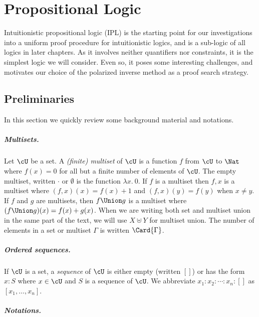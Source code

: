 \chapter{Propositional Logic}
\label{chapter-prop}

Intuitionistic propositional logic (IPL) is the starting point for our
investigations into a uniform proof procedure for intuitionistic logics, and is
a sub-logic of all logics in later chapters.  As it involves neither quantifiers
nor constraints, it is the simplest logic we will consider.
Even so, it poses some interesting challenges, and motivates our choice of the
polarized inverse method as a proof search strategy.

\section{Preliminaries}

In this section we quickly review some background material and notations.

\paragraph{Multisets.}

Let $\cU$ be a set. A \emph{(finite) multiset} of $\cU$
is a function $f$ from
$\cU$ to $\Nat$ where $f(x)=0$ for all but a finite number of elements of
$\cU$.  The empty multiset, written $\cdot$ or $\emptyset$ is the
function $\lambda x.\ 0$. If $f$ is a multiset then $f, x$ is a multiset
where $(f, x) (x) = f(x)+1$ and $(f, x) (y)=f (y)$ when $x\neq y$.
If $f$ and $g$ are multisets, then $f\Union g$ is a multiset where
$(f\Union g) (x) = f(x)+g(x)$.  When we are writing both set and multiset union
in the same part of the text, we will use $X \uplus Y$ for multiset union.
The number of elements in a set or multiset $\Gamma$ is written $\Card{\Gamma}$.

\paragraph{Ordered sequences.}

If $\cU$ is a set, a \emph{sequence} of $\cU$ is either empty (written $[]$)
or has the form $x:S$ where $x\in \cU$ and $S$ is a sequence of $\cU$.
We abbreviate $x_1 : x_2 : \cdots : x_n : []$ as $[x_1,\ldots,x_n]$.

\paragraph{Notations.}

